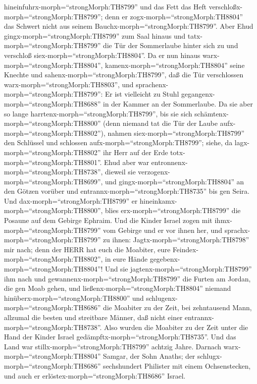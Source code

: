 hineinfuhrx-morph=``strongMorph:TH8799'' und das Fett das Heft
verschloßx-morph=``strongMorph:TH8799''; denn er
zogx-morph=``strongMorph:TH8804'' das Schwert nicht aus seinem
Bauchx-morph=``strongMorph:TH8799''.  Aber Ehud
gingx-morph=``strongMorph:TH8799'' zum Saal hinaus und
tatx-morph=``strongMorph:TH8799'' die Tür der Sommerlaube hinter sich zu
und verschloß siex-morph=``strongMorph:TH8804''.  Da er nun
hinaus warx-morph=``strongMorph:TH8804'',
kamenx-morph=``strongMorph:TH8804'' seine Knechte und
sahenx-morph=``strongMorph:TH8799'', daß die Tür verschlossen
warx-morph=``strongMorph:TH8803'', und
sprachenx-morph=``strongMorph:TH8799'': Er ist vielleicht zu Stuhl
gegangenx-morph=``strongMorph:TH8688'' in der Kammer an der Sommerlaube.
 Da sie aber so lange
harrtenx-morph=``strongMorph:TH8799'', bis sie sich
schämtenx-morph=``strongMorph:TH8800'' (denn niemand tat die Tür der
Laube aufx-morph=``strongMorph:TH8802''), nahmen
siex-morph=``strongMorph:TH8799'' den Schlüssel und schlossen
aufx-morph=``strongMorph:TH8799''; siehe, da
lagx-morph=``strongMorph:TH8802'' ihr Herr auf der Erde
totx-morph=``strongMorph:TH8801''.  Ehud aber war
entronnenx-morph=``strongMorph:TH8738'', dieweil sie
verzogenx-morph=``strongMorph:TH8699'', und
gingx-morph=``strongMorph:TH8804'' an den Götzen vorüber und
entrannx-morph=``strongMorph:TH8735'' bis gen Seira.  Und
dax-morph=``strongMorph:TH8799'' er
hineinkamx-morph=``strongMorph:TH8800'', blies
erx-morph=``strongMorph:TH8799'' die Posaune auf dem Gebirge Ephraim.
Und die Kinder Israel zogen mit ihmx-morph=``strongMorph:TH8799'' vom
Gebirge und er vor ihnen her,  und
sprachx-morph=``strongMorph:TH8799'' zu ihnen:
Jagtx-morph=``strongMorph:TH8798'' mir nach; denn der HERR hat euch die
Moabiter, eure Feindex-morph=``strongMorph:TH8802'', in eure Hände
gegebenx-morph=``strongMorph:TH8804''! Und sie
jagtenx-morph=``strongMorph:TH8799'' ihm nach und
gewannenx-morph=``strongMorph:TH8799'' die Furten am Jordan, die gen
Moab gehen, und ließenx-morph=``strongMorph:TH8804'' niemand
hinüberx-morph=``strongMorph:TH8800''  und
schlugenx-morph=``strongMorph:TH8686'' die Moabiter zu der Zeit, bei
zehntausend Mann, allzumal die besten und streitbare Männer, daß nicht
einer entrannx-morph=``strongMorph:TH8738''.  Also wurden
die Moabiter zu der Zeit unter die Hand der Kinder Israel
gedämpftx-morph=``strongMorph:TH8735''. Und das Land war
stillx-morph=``strongMorph:TH8799'' achtzig Jahre.  Darnach
warx-morph=``strongMorph:TH8804'' Samgar, der Sohn Anaths; der
schlugx-morph=``strongMorph:TH8686'' sechshundert Philister mit einem
Ochsenstecken, und auch er erlöstex-morph=``strongMorph:TH8686'' Israel.

